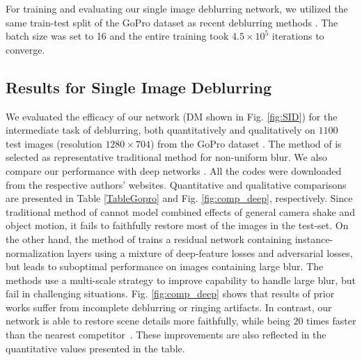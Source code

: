 \documentclass[10pt,twocolumn,letterpaper]{article}
\begin{document}
For training and evaluating our single image deblurring network, we utilized the same train-test split of the GoPro dataset \cite{nah2017deep} as recent deblurring methods \cite{nah2017deep}\cite{tao2018scale}. The batch size was set to 16 and the entire training took $4.5 \times 10^5$ iterations to converge.
\vspace{-3mm}
\subsection{Results for Single Image Deblurring }
We evaluated the efficacy of our network (DM shown in Fig. \ref{fig:SID}) for the intermediate task of deblurring, both quantitatively and qualitatively on $1100$ test images (resolution $1280\times704$) from the GoPro dataset \cite{nah2017deep}. The method of \cite{whyte2012non} is selected as representative traditional method for non-uniform blur. We also compare our performance with deep networks \cite{nah2017deep,kupyn2017deblurgan,tao2018scale}. All the codes were downloaded from the respective authors' websites. Quantitative and qualitative comparisons are presented in Table \ref{TableGopro} and Fig. \ref{fig:comp_deep}, respectively. Since traditional method of \cite{whyte2012non} cannot model combined effects of general camera shake and object motion, it fails to faithfully restore most of the images in the test-set. On the other hand, the method of \cite{kupyn2017deblurgan} trains a residual network containing instance-normalization layers using a mixture of deep-feature losses and adversarial losses, but leads to suboptimal performance on images containing large blur. The methods \cite{nah2017deep,tao2018scale} use a multi-scale strategy to improve capability to handle large blur, but fail in challenging situations. Fig. \ref{fig:comp_deep} shows that results of prior works suffer from incomplete deblurring or ringing artifacts. In contrast, our network is able to restore scene details more faithfully, while being $20$ times faster than the nearest competitor~\cite{tao2018scale}. These improvements are also reflected in the quantitative values presented in the table.
\end{document}
